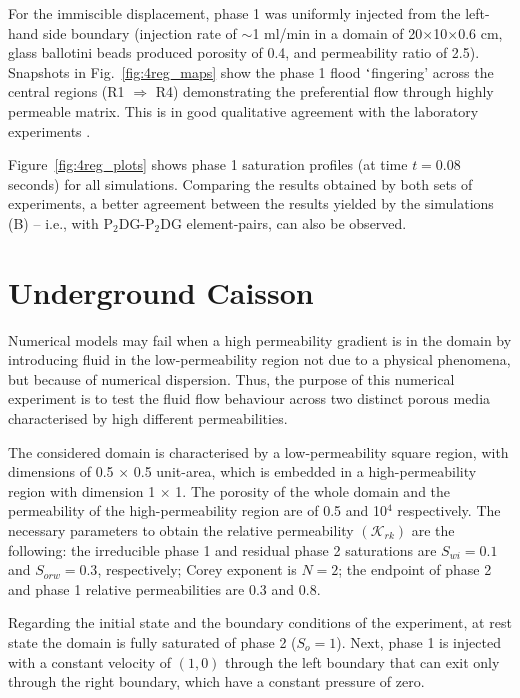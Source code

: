 \documentclass[preprint,authoryear,12pt]{elsarticle}
\newcommand{\PN}[2][error]{P$_{#1}$DG-P$_{#2}$}
\begin{document}
For the immiscible displacement, phase 1 was uniformly injected from
the left-hand side boundary (injection rate of $\sim$1 ml/min in a
domain of 20$\times$10$\times$0.6 cm, glass ballotini beads produced
porosity of 0.4, and permeability ratio of 2.5). Snapshots in
Fig.~\ref{fig:4reg_maps} show the phase 1 flood $\lq$fingering' across
the central regions (R1 $\Rightarrow$ R4) demonstrating the
preferential flow through highly permeable matrix. This is in good
qualitative agreement with the laboratory experiments \citep[see
  Figs. 5 and 6 in][]{dawe_2008}.


Figure~\ref{fig:4reg_plots} shows phase 1 saturation profiles (at time
$t=0.08$ seconds) for all simulations. Comparing the results obtained
by both sets of experiments, a better agreement between the results
yielded by the simulations (B) -- i.e., with \PN[2]{2}DG
element-pairs, can also be observed.


\section{Underground Caisson}\label{res3}
Numerical models may fail when a high permeability gradient is in the
domain by introducing fluid in the low-permeability region not due to
a physical phenomena, but because of numerical dispersion. Thus, the
purpose of this numerical experiment is to test the fluid flow
behaviour across two distinct porous media characterised by high
different permeabilities.

The considered domain is characterised by a low-permeability square
region, with dimensions of 0.5 $\times$ 0.5 unit-area, which is
embedded in a high-permeability region with dimension 1 $\times$
1. The porosity of the whole domain and the permeability of the
high-permeability region are of 0.5 and 10$^{4}$ respectively. The
necessary parameters to obtain the relative permeability
$\left(\mathcal{K}_{rk}\right)$ are the following: the irreducible
phase 1 and residual phase 2 saturations are $S_{wi} = 0.1$ and
$S_{orw}=0.3$, respectively; Corey exponent is $N=2$; the endpoint of
phase 2 and phase 1 relative permeabilities are 0.3 and 0.8.

Regarding the initial state and the boundary conditions of the
experiment, at rest state the domain is fully saturated of phase 2
($S_o=1$). Next, phase 1 is injected with a constant velocity of
$(1,0)$ through the left boundary that can exit only through the right
boundary, which have a constant pressure of zero.
\end{document}
